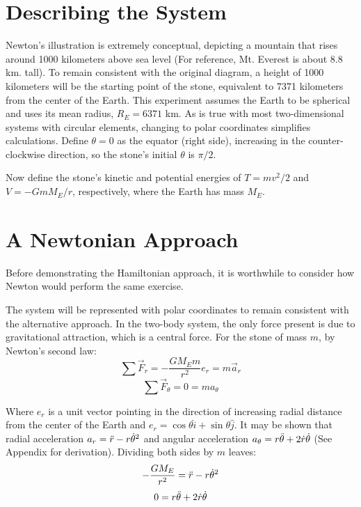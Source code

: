 \documentclass[aps,twocolumn]{revtex4-1}
\begin{document}
\section{Describing the System}
Newton's illustration is extremely conceptual, depicting a mountain that rises around 1000 kilometers above sea level (For reference, Mt. Everest\cite{everest} is about 8.8 km. tall). To remain consistent with the original diagram, a height of 1000 kilometers will be the starting point of the stone, equivalent to 7371 kilometers from the center of the Earth. This experiment assumes the Earth to be spherical and uses its mean radius\cite{meanRadius}, $R_E=6371$ km. As is true with most two-dimensional systems with circular elements, changing to polar coordinates simplifies calculations. Define $\theta=0$ as the equator (right side), increasing in the counter-clockwise direction, so the stone's initial $\theta$ is $\pi/2$.

Now define the stone's kinetic and potential energies of $T=mv^2/2$ and $V=-GmM_E/r$, respectively, where the Earth has mass $M_E$.

\section{A Newtonian Approach}
Before demonstrating the Hamiltonian approach, it is worthwhile to consider how Newton would perform the same exercise.

The system will be represented with polar coordinates to remain consistent with the alternative approach. In the two-body system, the only force present is due to gravitational attraction, which is a central force. For the stone of mass $m$, by Newton's second law:
\begin{equation}
    \sum\Vec{F}_{r} = -\frac{GM_Em}{r^2}e_r = m\Vec a_r
\end{equation}
\begin{equation}
    \sum\Vec{F}_\theta = 0 = ma_\theta
\end{equation}

Where $e_r$ is a unit vector pointing in the direction of increasing radial distance from the center of the Earth and $e_r=\cos{\theta} \hat{i} + \sin{\theta}\hat{j}$. It may be shown that radial acceleration $a_r=\Ddot{r}-r\dot{\theta}^2$ and angular acceleration $a_\theta = r\Ddot \theta + 2\dot r \dot \theta$ (See Appendix for derivation). Dividing both sides by $m$ leaves:
\begin{equation}
    -\frac{GM_E}{r^2} = \Ddot r - r\dot \theta^2
\end{equation}
\begin{equation}
    0 = r\Ddot \theta + 2\dot r \dot \theta
\end{equation}
\end{document}
